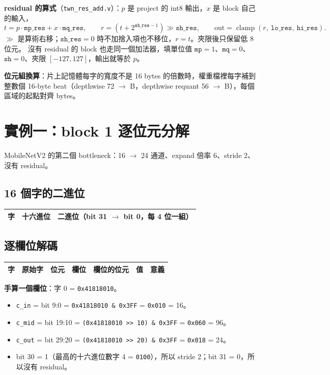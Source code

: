 \documentclass[10pt,a4paper]{article}
\newcommand{\f}[1]{\texttt{#1}}
\begin{document}
\textbf{residual 的算式}（\f{twn\_res\_add.v}）：$p$ 是 project 的 int8 輸出，$x$ 是 block 自己的輸入，
\[
t = p \cdot \texttt{mp\_res} + x \cdot \texttt{mq\_res},\qquad
r = (t + 2^{\texttt{sh\_res}-1}) \gg \texttt{sh\_res},\qquad
\text{out} = \operatorname{clamp}(r,\ \texttt{lo\_res},\ \texttt{hi\_res}).
\]
$\gg$ 是算術右移；$\texttt{sh\_res} = 0$ 時不加捨入項也不移位，$r = t$。夾限後只保留低 8 位元。
沒有 residual 的 block 也走同一個加法器，填單位值 $\texttt{mp}=1$、$\texttt{mq}=0$、$\texttt{sh}=0$、夾限 $[-127, 127]$，輸出就等於 $p$。

\textbf{位元組換算}：片上記憶體每字的寬度不是 16 bytes 的倍數時，權重檔裡每字補到整數個 16-byte beat（depthwise 72 $\rightarrow$ \FileBdw{} B，depthwise requant 56 $\rightarrow$ \FileBrqd{} B），每個區域的起點對齊 \AlignB{} bytes。

\newpage
\section{實例一：block 1 逐位元分解}
MobileNetV2 的第二個 bottleneck：16 $\rightarrow$ 24 通道、expand 倍率 6、stride 2、沒有 residual。

\subsection*{16 個字的二進位}
\begin{tabular}{@{}r c l@{}}
\toprule
字 & 十六進位 & 二進位（bit 31 $\rightarrow$ bit 0，每 4 位一組） \\
\midrule

\end{tabular}

\subsection*{逐欄位解碼}
\footnotesize
\begin{longtable}{@{}r c c L{20mm} L{31mm} r L{58mm}@{}}
\toprule
字 & 原始字 & 位元 & 欄位 & 欄位的位元 & 值 & 意義 \\
\midrule
\endhead

\end{longtable}
\normalsize

\textbf{手算一個欄位}：字 0 = \f{0x41818010}。
\begin{itemize}
\item \f{c\_in} = bit 9:0 = \f{0x41818010 \& 0x3FF} = \f{0x010} = 16。
\item \f{c\_mid} = bit 19:10 = \f{(0x41818010 >> 10) \& 0x3FF} = \f{0x060} = 96。
\item \f{c\_out} = bit 29:20 = \f{(0x41818010 >> 20) \& 0x3FF} = \f{0x018} = 24。
\item bit 30 = 1（最高的十六進位數字 4 = \f{0100}），所以 stride 2；bit 31 = 0，所以沒有 residual。
\end{itemize}
\end{document}
